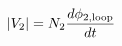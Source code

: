 \documentclass[preview]{standalone}
\begin{document}
\begin{align*}
|V_2| = N_2 {d \phi_{2,\text{loop}} \over d t}
\end{align*}
\end{document}
